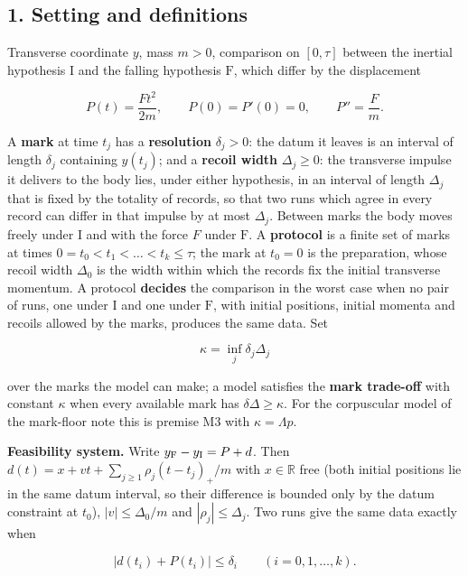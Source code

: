 \documentclass[11pt,a4paper]{article}
\begin{document}
\hypertarget{setting-and-definitions}{%
\subsection{1. Setting and definitions}\label{setting-and-definitions}}

Transverse coordinate \(y\), mass \(m>0\), comparison on \([0,\tau]\)
between the inertial hypothesis \(\mathrm I\) and the falling hypothesis
\(\mathrm F\), which differ by the displacement

\[P(t)=\frac{Ft^2}{2m},\qquad P(0)=P'(0)=0,\qquad P''=\frac Fm .\]

A \textbf{mark} at time \(t_j\) has a \textbf{resolution}
\(\delta_j>0\): the datum it leaves is an interval of length
\(\delta_j\) containing \(y(t_j)\); and a \textbf{recoil width}
\(\Delta_j\ge0\): the transverse impulse it delivers to the body lies,
under either hypothesis, in an interval of length \(\Delta_j\) that is
fixed by the totality of records, so that two runs which agree in every
record can differ in that impulse by at most \(\Delta_j\). Between marks
the body moves freely under \(\mathrm I\) and with the force \(F\) under
\(\mathrm F\). A \textbf{protocol} is a finite set of marks at times
\(0=t_0<t_1<\dots<t_k\le\tau\); the mark at \(t_0=0\) is the
preparation, whose recoil width \(\Delta_0\) is the width within which
the records fix the initial transverse momentum. A protocol
\textbf{decides} the comparison in the worst case when no pair of runs,
one under \(\mathrm I\) and one under \(\mathrm F\), with initial
positions, initial momenta and recoils allowed by the marks, produces
the same data. Set

\[\kappa=\inf_j\delta_j\Delta_j\]

over the marks the model can make; a model satisfies the \textbf{mark
trade-off} with constant \(\kappa\) when every available mark has
\(\delta\Delta\ge\kappa\). For the corpuscular model of the mark-floor
note this is premise M3 with \(\kappa=\Lambda p\).

\textbf{Feasibility system.} Write \(y_{\rm F}-y_{\rm I}=P+d\). Then
\(d(t)=x+vt+\sum_{j\ge1}\rho_j(t-t_j)_+/m\) with \(x\in\mathbb R\) free
(both initial positions lie in the same datum interval, so their
difference is bounded only by the datum constraint at \(t_0\)),
\(|v|\le\Delta_0/m\) and \(|\rho_j|\le\Delta_j\). Two runs give the same
data exactly when

\[|d(t_i)+P(t_i)|\le\delta_i\qquad(i=0,1,\dots,k). \tag{1}\]
\end{document}
